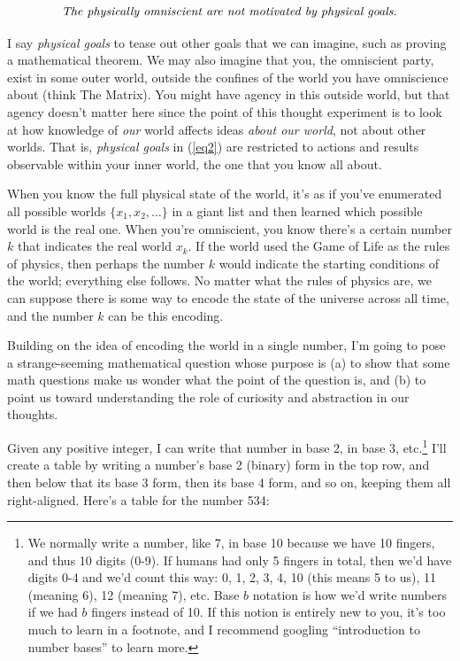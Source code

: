 \documentclass[11pt, oneside]{article}   	%
\begin{document}
\begin{equation}\label{eq2}
    \text{\em The physically omniscient are not motivated by
    physical goals.}
\end{equation}
 
I say {\em physical goals} to tease out other goals that we can imagine, such as
proving a mathematical theorem. We may also imagine that you, the omniscient
party, exist in some outer world, outside the confines of the world you have
omniscience about (think The Matrix).
You might have agency in this outside world, but that agency doesn't matter here
since the point of this thought
experiment is to look at how knowledge of {\em our} world affects ideas {\em
about our world}, not about other worlds.
That is, {\em physical goals} in (\ref{eq2})
are restricted to actions and results observable
within your inner world, the one that you know all about.

When you know the full physical state of the world, it's as if you've
enumerated
all possible worlds $\{x_1, x_2, \ldots\}$ in a giant list and
then learned which possible world is the real one. When you're omniscient, you
know there's a certain number $k$ that indicates the real world $x_k$.
If the world used the Game of Life as the rules of physics, then perhaps the
number $k$ would indicate the starting conditions of the world; everything else
follows. No matter what the rules of physics are, we can suppose there is some
way to encode the state of the universe across all time, and the number
$k$ can be this encoding.

Building on the idea of encoding the world in a single number,
I'm going to pose a strange-seeming mathematical question whose purpose is
(a) to show that some math questions make us wonder what the
point of the question is, and (b) to point us toward understanding the role of
curiosity and abstraction in our thoughts.

Given any positive integer, I can write that number in base 2, in base 3,
etc.\footnote{We normally write a number, like 7, in base 10 because we have 10
fingers, and thus 10 digits (0-9). If humans had only 5 fingers in total, then
we'd have
digits 0-4 and we'd count this way: 0, 1, 2, 3, 4, 10 (this means 5 to us), 11
(meaning 6), 12 (meaning 7), etc. Base $b$ notation is how we'd write numbers if
we had $b$ fingers instead of 10. If this notion is entirely new to you, it's
too much to learn in a footnote, and I recommend googling ``introduction to
number bases'' to learn more.}
I'll create a table by writing a number's base 2 (binary)
form in the top row,
and then below that its base 3 form, then its base 4 form, and so on, keeping
them all right-aligned. Here's a table for the number 534:
\end{document}
